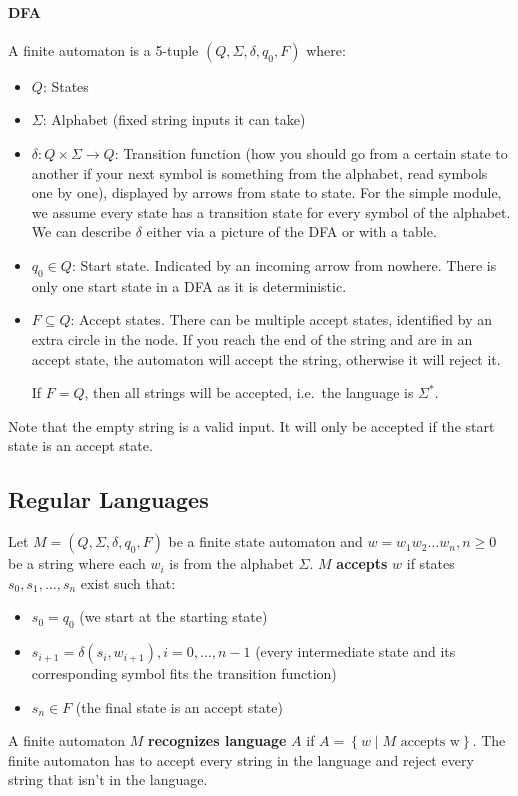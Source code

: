 \documentclass[12 pt]{article}
\begin{document}
\paragraph{DFA} A finite automaton is a 5-tuple $(Q, \Sigma, \delta,
q_0, F)$ where:
\begin{itemize}
\item $Q$: States
\item $\Sigma$: Alphabet (fixed string inputs it can take)
\item $\delta: Q \times \Sigma \to Q$: Transition function (how you should go from a certain state to
  another if your next symbol is something from the alphabet, read
  symbols one by one), displayed by arrows from state to state. For
  the simple module, we assume every state has a transition state for
  every symbol of the alphabet. We can describe $\delta$ either via a
  picture of the DFA or with a table.
\item $q_0 \in Q$: Start state. Indicated by an incoming arrow from nowhere. There
  is only one start state in a DFA as it is deterministic.
\item $F \subseteq Q$: Accept states. There can be multiple accept states, identified
  by an extra circle in the node. If you reach the end of the string
  and are in an accept state, the automaton will accept the string,
  otherwise it will reject it.

  If $F = Q$, then all strings will be accepted, i.e.\ the language is $\Sigma^*$.
\end{itemize}
Note that the empty string is a valid input. It will only be accepted
if the start state is an accept state.
\subsection{Regular Languages} Let $M = (Q, \Sigma, \delta, q_0, F)$
be a finite state automaton and $w = w_1w_2\ldots w_n, n \geq 0$ be a
string where each $w_i$ is from the alphabet $\Sigma$. $M$
\textbf{accepts} $w$ if states $s_0,s_1, \ldots, s_n$ exist such that:
\begin{itemize}
\item $s_0=q_0$ (we start at the starting state)
\item $s_{i+1} = \delta(s_i, w_{i+1}), i = 0, \ldots, n-1$ (every
  intermediate state and its corresponding symbol fits the transition function)
\item $s_n \in F$ (the final state is an accept state)
\end{itemize}
A finite automaton $M$ \textbf{recognizes language} $A$ if $A =
\left\{w \mid M \text{ accepts w}\right\}$. The finite automaton has
to accept every string in the language and reject every string that
isn't in the language.
\end{document}

